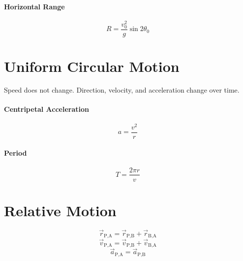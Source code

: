 \documentclass{article}
\begin{document}
        \paragraph{Horizontal Range}
        \begin{equation}
            R = \frac{v_0^2}{g} \sin{2\theta_0}
        \end{equation}

    \section{Uniform Circular Motion}

        Speed does not change. Direction, velocity, and acceleration change over time.

        \paragraph{Centripetal Acceleration}
        \begin{equation}
            a = \frac{v^2}{r}
        \end{equation}

        \paragraph{Period}
        \begin{equation}
            T = \frac{2 \pi r}{v}
        \end{equation}

    \section{Relative Motion}

        \begin{equation}
            \vec{r}_\text{P,A} = \vec{r}_\text{P,B} + \vec{r}_\text{B,A}
        \end{equation}
        \begin{equation}
            \vec{v}_\text{P,A} = \vec{v}_\text{P,B} + \vec{v}_\text{B,A}
        \end{equation}
        \begin{equation}
            \vec{a}_\text{P,A} = \vec{a}_\text{P,B}
        \end{equation}
\end{document}
